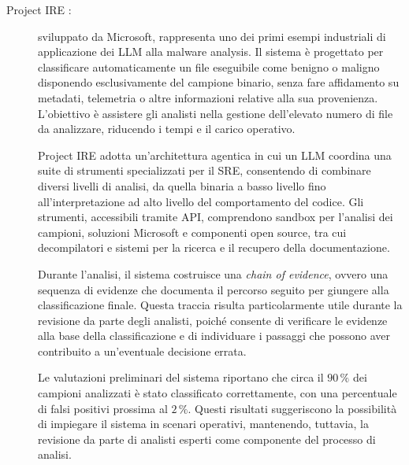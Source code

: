 \begin{description}
    \item[Project IRE \cite{caswell2025projectire}:] sviluppato da Microsoft, rappresenta uno dei primi esempi industriali di applicazione dei LLM alla malware analysis. Il sistema è progettato per classificare automaticamente un file eseguibile come benigno o maligno disponendo esclusivamente del campione binario, senza fare affidamento su metadati, telemetria o altre informazioni relative alla sua provenienza. L'obiettivo è assistere gli analisti nella gestione dell'elevato numero di file da analizzare, riducendo i tempi e il carico operativo.

    Project IRE adotta un'architettura agentica in cui un LLM coordina una suite di strumenti specializzati per il SRE, consentendo di combinare diversi livelli di analisi, da quella binaria a basso livello fino all'interpretazione ad alto livello del comportamento del codice. Gli strumenti, accessibili tramite API, comprendono sandbox per l'analisi dei campioni, soluzioni Microsoft e componenti open source, tra cui decompilatori e sistemi per la ricerca e il recupero della documentazione.


    Durante l'analisi, il sistema costruisce una \emph{chain of evidence}, ovvero una sequenza di evidenze che documenta il percorso seguito per giungere alla classificazione finale. Questa traccia risulta particolarmente utile durante la revisione da parte degli analisti, poiché consente di verificare le evidenze alla base della classificazione e di individuare i passaggi che possono aver contribuito a un'eventuale decisione errata.

    Le valutazioni preliminari del sistema riportano che circa il $90\,\%$ dei campioni analizzati è stato classificato correttamente, con una percentuale di falsi positivi prossima al $2\,\%$. Questi risultati suggeriscono la possibilità di impiegare il sistema in scenari operativi, mantenendo, tuttavia, la revisione da parte di analisti esperti come componente del processo di analisi.


\end{description}
